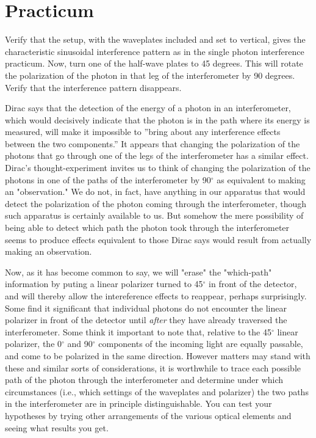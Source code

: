 \section*{Practicum}

Verify that the setup, with the waveplates included and set to vertical, gives the characteristic sinusoidal interference pattern as in the single photon interference practicum.  Now, turn one of the half-wave plates to 45 degrees.  This will rotate the polarization of the photon in that leg of the interferometer by 90 degrees.  Verify that the interference pattern disappears.

Dirac says that the detection of the energy of a photon in an interferometer, which would decisively indicate that the photon is in the path where its energy is measured, will make it impossible to ''bring about any interference effects between the two components.'' It appears that changing the polarization of the photons that go through one of the legs of the interferometer has a similar effect.  Dirac's thought-experiment invites us to think of changing the polarization of the photons in one of the paths of the interferometer by 90$^\circ$ as equivalent to making an "observation." We do not, in fact, have anything in our apparatus that would detect the polarization of the photon coming through the interferometer, though such apparatus is certainly available to us.  But somehow the mere possibility of being able to detect which path the photon took through the interferometer seems to produce effects equivalent to those Dirac says would result from actually making an observation.

Now, as it has become common to say, we will "erase" the "which-path" information by puting a linear polarizer turned to 45$^\circ$ in front of the detector, and will thereby allow the intereference effects to reappear, perhaps surprisingly. Some find it significant that individual photons do not encounter the linear polarizer in front of the detector until \emph{after} they have already traversed the interferometer. Some think it important to note that, relative to the 45$^\circ$ linear polarizer, the 0$^\circ$ and 90$^\circ$ components of the incoming light are equally passable, and come to be polarized in the same direction.   However matters may stand with these and similar sorts of considerations, it is worthwhile to trace each possible path of the photon through the interferometer and determine under which circumstances (i.e., which settings of the waveplates and polarizer) the two paths in the interferometer are in principle distinguishable.  You can test your hypotheses by trying other arrangements of the various optical elements and seeing what results you get.

